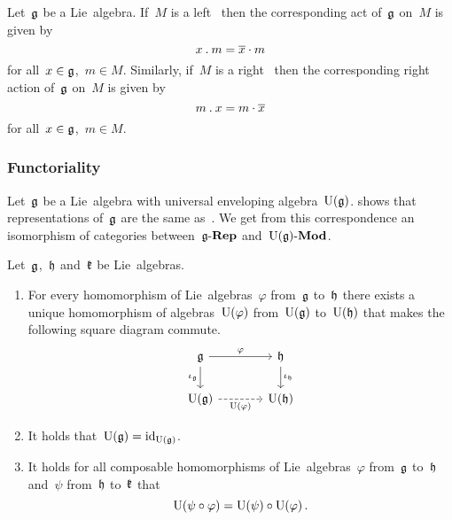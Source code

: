 \begin{fluff}
  Let~$\mathfrak{g}$ be a Lie~algebra.
  If~$M$ is a left~\module{$\Univ(\glie)$} then the corresponding act of~$\mathfrak{g}$ on~$M$ is given by
  \[
    x \mathbin{.} m
    =
    \overline{x} \cdot m
  \]
  for all~$x \in \mathfrak{g}$,~$m \in M$.
  Similarly, if~$M$ is a right~\module{$\Univ(\glie)$} then the corresponding right action of~$\mathfrak{g}$ on~$M$ is given by
  \[
    m \mathbin{.} x
    =
    m \cdot \overline{x}
  \]
  for all~$x \in \mathfrak{g}$,~$m \in M$.
\end{fluff}

\subsubsection{Functoriality}

\begin{remark}
  Let~$\mathfrak{g}$ be a Lie~algebra with universal enveloping algebra~$\Univ(\glie)$.
   shows that representations of~$\mathfrak{g}$ are the same as~{\modules{$\Univ(\glie)$}}.
  We get from this correspondence an isomorphism of categories between~$\mathfrak{g}\text{-}\mathbf{Rep}$ and~$\operatorname{U}(\mathfrak{g})\text{-}\mathbf{Mod}$.
\end{remark}


\begin{lemma}
  \label{functoriality of universal enveloping algebra}
  Let~$\mathfrak{g}$,~$\mathfrak{h}$ and~$\mathfrak{k}$ be Lie~algebras.
  \begin{enumerate}
    \item
      For every homomorphism of Lie~algebras~$\varphi$ from~$\mathfrak{g}$ to~$\mathfrak{h}$ there exists a unique homomorphism of algebras~$\operatorname{U}(\varphi)$ from~$\Univ(\glie)$ to~$\operatorname{U}(\mathfrak{h})$ that makes the following square diagram commute.
      \[
        \begin{tikzcd}[column sep = large]
          \glie
          \arrow{r}[above]{\varphi}
          \arrow{d}[left]{\iota_{\glie}}
          &
          \hlie
          \arrow{d}[right]{\iota_{\hlie}}
          \\
          \Univ(\glie)
          \arrow[dashed]{r}[below]{\Univ(\varphi)}
          &
          \Univ(\hlie)
        \end{tikzcd}
      \]
    \item
      It holds that~$\operatorname{U}(\mathfrak{g}) = \mathrm{id}_{\operatorname{U}(\mathfrak{g})}$.
    \item
      It holds for all composable homomorphisms of Lie~algebras~$\varphi$ from~$\mathfrak{g}$ to~$\mathfrak{h}$ and~$\psi$ from~$\mathfrak{h}$ to~$\mathfrak{k}$ that
      \[
        \operatorname{U}( \psi \circ \varphi )
        =
        \operatorname{U}( \psi ) \circ \operatorname{U}( \varphi ) \,.
      \]
  \end{enumerate}
\end{lemma}


